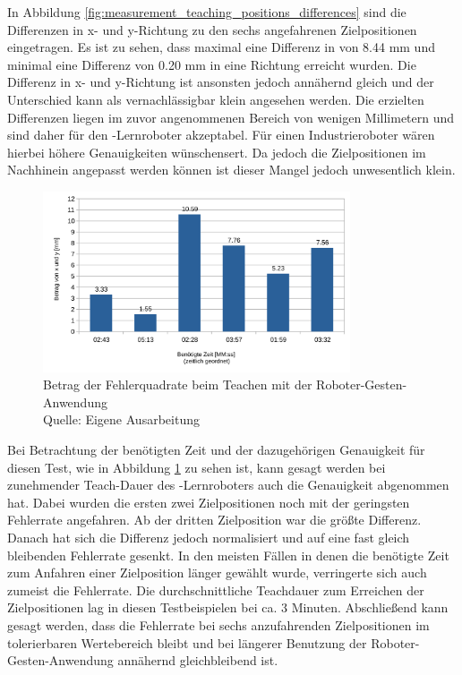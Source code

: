 In Abbildung \ref {fig:measurement_teaching_positions_differences} sind die Differenzen in x- und y-Richtung zu den sechs angefahrenen Zielpositionen eingetragen. Es ist zu sehen, dass maximal eine Differenz in von \num{8,44} mm und minimal eine Differenz von \num{0,20} mm in eine Richtung erreicht wurden. Die Differenz in x- und y-Richtung ist ansonsten jedoch annähernd gleich und der Unterschied kann als vernachlässigbar klein angesehen werden. Die erzielten Differenzen liegen im zuvor angenommenen Bereich von wenigen Millimetern und sind daher für den -Lernroboter akzeptabel. Für einen Industrieroboter wären hierbei höhere Genauigkeiten wünschensert. Da jedoch die Zielpositionen im Nachhinein angepasst werden können ist dieser Mangel jedoch unwesentlich klein.

\begin{figure}[htb]
	\centering
	\includegraphics[width=0.808\textwidth]{images/ergebnisse/Betrag_der_Fehlerquadrate}
	\caption[Betrag der Fehlerquadrate beim Teachen mit der Roboter-Gesten-Anwendung]{Betrag der Fehlerquadrate beim Teachen mit der Roboter-Gesten-Anwendung\\Quelle: Eigene Ausarbeitung}
	\label{fig:measurement_teaching_positions_time_and_errors}
\end{figure}
\FloatBarrier

Bei Betrachtung der benötigten Zeit und der dazugehörigen Genauigkeit für diesen Test, wie in Abbildung \ref{fig:measurement_teaching_positions_time_and_errors} zu sehen ist, kann gesagt werden bei zunehmender Teach-Dauer des -Lernroboters auch die Genauigkeit abgenommen hat. Dabei wurden die ersten zwei Zielpositionen noch mit der geringsten Fehlerrate angefahren. Ab der dritten Zielposition war die größte Differenz. Danach hat sich die Differenz jedoch normalisiert und auf eine fast gleich bleibenden Fehlerrate gesenkt. In den meisten Fällen in denen die benötigte Zeit zum Anfahren einer Zielposition länger gewählt wurde, verringerte sich auch zumeist die Fehlerrate. Die durchschnittliche Teachdauer zum Erreichen der Zielpositionen lag in diesen Testbeispielen bei ca. 3 Minuten. Abschließend kann gesagt werden, dass die Fehlerrate bei sechs anzufahrenden Zielpositionen im tolerierbaren Wertebereich bleibt und bei längerer Benutzung der Roboter-Gesten-Anwendung annähernd gleichbleibend ist.

